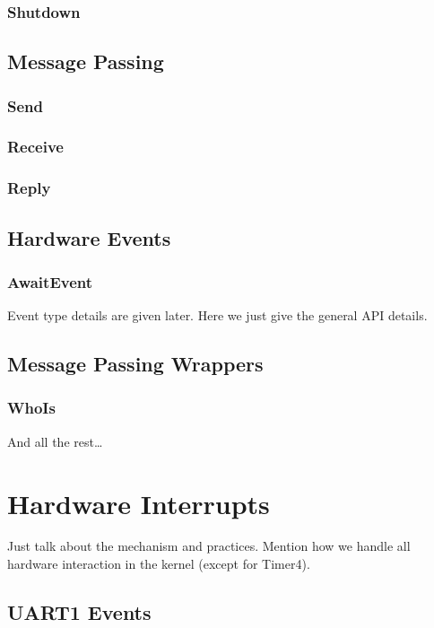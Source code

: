 \documentclass[pdftex,10pt,a4paper]{article}
\begin{document}
\subsubsection*{Shutdown}

\subsection*{Message Passing}

\subsubsection*{Send}
\subsubsection*{Receive}
\subsubsection*{Reply}

\subsection*{Hardware Events}

\subsubsection*{AwaitEvent}

Event type details are given later. Here we just give the general API
details.

\subsection*{Message Passing Wrappers}

\subsubsection*{WhoIs}

And all the rest\ldots

\section*{Hardware Interrupts}

Just talk about the mechanism and practices. Mention how we handle all
hardware interaction in the kernel (except for Timer4).

\subsection*{UART1 Events}
\end{document}
